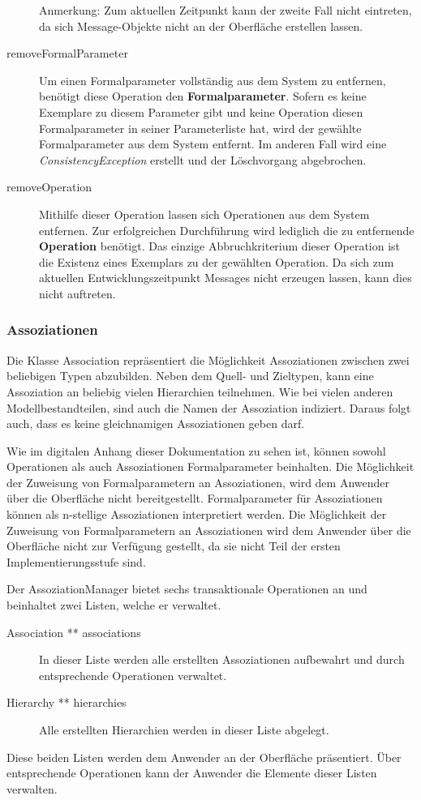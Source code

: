 \begin{description}
Anmerkung: Zum aktuellen Zeitpunkt kann der zweite Fall nicht eintreten, da sich Message-Objekte nicht an der Oberfläche erstellen lassen.
\item[removeFormalParameter]
Um einen Formalparameter vollständig aus dem System zu entfernen, benötigt diese Operation den \textbf{Formalparameter}. Sofern es keine Exemplare zu diesem Parameter gibt und keine Operation diesen Formalparameter in seiner Parameterliste hat, wird der gewählte Formalparameter aus dem System entfernt. Im anderen Fall wird eine \emph{ConsistencyException} erstellt und der Löschvorgang abgebrochen.
\item[removeOperation]
Mithilfe dieser Operation lassen sich Operationen aus dem System entfernen. Zur erfolgreichen Durchführung wird lediglich die zu entfernende \textbf{Operation} benötigt. Das einzige Abbruchkriterium dieser Operation ist die Existenz eines Exemplars zu der gewählten Operation. Da sich zum aktuellen Entwicklungszeitpunkt Messages nicht erzeugen lassen, kann dies nicht auftreten.

\end{description}

\subsubsection{Assoziationen}\label{Operation:Associationen}

Die Klasse Association repräsentiert die Möglichkeit Assoziationen zwischen zwei beliebigen Typen abzubilden.
Neben dem Quell- und Zieltypen, kann eine Assoziation an beliebig vielen Hierarchien teilnehmen.
Wie bei vielen anderen Modellbestandteilen, sind auch die Namen der Assoziation indiziert. Daraus folgt auch, dass es keine gleichnamigen 
Assoziationen geben darf.

Wie im digitalen Anhang dieser Dokumentation zu sehen ist, können sowohl Operationen als auch Assoziationen Formalparameter beinhalten. Die Möglichkeit der Zuweisung von
Formalparametern an Assoziationen, wird dem Anwender über die Oberfläche nicht bereitgestellt. 
Formalparameter für Assoziationen können als n-stellige Assoziationen interpretiert werden.
Die Möglichkeit der Zuweisung von Formalparametern an Assoziationen wird dem Anwender über die Oberfläche nicht zur Verfügung gestellt, da sie nicht Teil der ersten Implementierungsstufe sind.


Der AssoziationManager bietet sechs transaktionale Operationen an und beinhaltet zwei Listen, welche er verwaltet.
\begin{description}
\item[Association ** associations] In dieser Liste werden alle erstellten Assoziationen aufbewahrt und durch entsprechende Operationen verwaltet.
\item[Hierarchy ** hierarchies] Alle erstellten Hierarchien werden in dieser Liste abgelegt.
\end{description}
Diese beiden Listen werden dem Anwender an der 
Oberfläche präsentiert. Über entsprechende Operationen kann der Anwender die Elemente dieser Listen verwalten.

